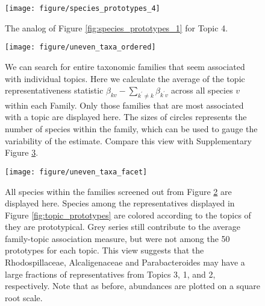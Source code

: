 \documentclass{article}
\begin{document}
\begin{figure}[!p]
  \centering
  \texttt{[image: figure/species\_prototypes\_4]}
  \caption{The analog of Figure \ref{fig:species_prototypes_1} for Topic
    4. \label{fig:species_prototypes_4} }
\end{figure}

\begin{figure}[!p]
  \centering
  \texttt{[image: figure/uneven\_taxa\_ordered]}
  \caption{We can search for entire taxonomic families that seem associated with
    individual topics. Here we calculate the average of the topic
    representativeness statistic $\beta_{kv} - \sum_{k^{\prime} \neq k}
    \beta_{k^{\prime} v}$ across all species $v$ within each
    Family. Only those families that are most associated with a topic are
    displayed here. The sizes of circles represents the number of species within
    the family, which can be used to gauge the variability of the
    estimate. Compare this view with Supplementary Figure
    \ref{fig:uneven_taxa_facet}. \label{fig:uneven_taxa_ordered} }
\end{figure}

\begin{figure}[!p]
  \centering
  \texttt{[image: figure/uneven\_taxa\_facet]}
  \caption{All species within the families screened out from Figure
    \ref{fig:uneven_taxa_ordered} are displayed here. Species among the
    representatives displayed in Figure \ref{fig:topic_prototypes} are colored
    according to the topics of they are prototypical. Grey series still
    contribute to the average family-topic association measure, but were not
    among the 50 prototypes for each topic. This view suggests that the
    Rhodospillaceae, Alcaligenaceae and Parabacteroides may have a large
    fractions of representatives from Topics 3, 1, and 2, respectively. Note
    that as before, abundances are plotted on a square root
    scale. \label{fig:uneven_taxa_facet} }
\end{figure}
\end{document}
